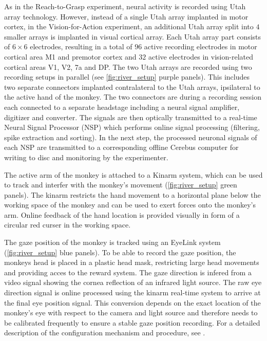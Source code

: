 As in the Reach-to-Grasp experiment, neural activity is recorded using Utah array technology. However, instead of a single Utah array implanted in motor cortex, in the Vision-for-Action experiment, an additional Utah array split into $4$ smaller arrays is implanted in visual cortical array. Each Utah array part consists of $6\times6$ electrodes, resulting in a total of $96$ active recording electrodes in motor cortical area M1 and premotor cortex and $32$  active electrodes in vision-related cortical areas V1, V2, 7a and DP. The two Utah arrays are recorded using two recording setups in parallel (see \cref{fig:river_setup} purple panels). This includes two separate connectors implanted contralateral to the Utah arrays, ipsilateral to the active hand of the monkey. The two connectors are during a recording session each connected to a separate headstage including a neural signal amplifier, digitizer and converter. The signals are then optically transmitted to a real-time Neural Signal Processor (NSP) which performs online signal processing (filtering, spike extraction and sorting). In the next step, the processed neuronal signals of each NSP are transmitted to a corresponding offline Cerebus computer for writing to disc and monitoring by the experimenter.

The active arm of the monkey is attached to a Kinarm system, which can be used to track and interfer with the monkey's movement (\cref{fig:river_setup} green panels). The kinarm restricts the hand movement to a horizontal plane below the working space of the monkey and can be used to exert forces onto the monkey's arm. Online feedback of the hand location is provided visually in form of a circular red curser in the working space.

The gaze position of the monkey is tracked using an EyeLink system (\cref{fig:river_setup} blue panels). To be able to record the gaze position, the monkeys head is placed in a plastic head mask, restricting large head movements and providing acces to the reward system. The gaze direction is infered from a video signal showing the cornea reflection of an infrared light source. The raw eye direction signal is online processed using the kinarm real-time system to arrive at the final eye position signal. This conversion depends on the exact location of the monkey's eye with respect to the camera and light source and therefore needs to be calibrated frequently to ensure a stable gaze position recording. For a detailed description of the configuration mechanism and procedure, see \citet{deHaan_2018}.


